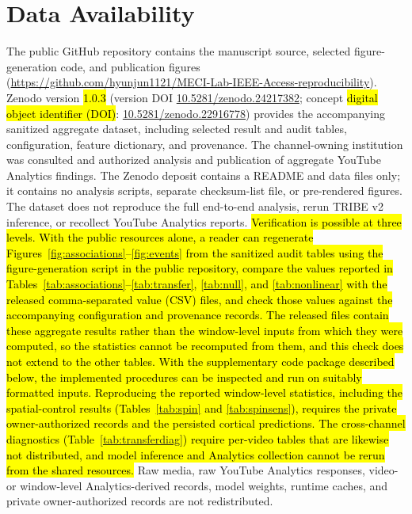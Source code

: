 \documentclass{ieeeaccess}
\newcommand{\rev}[1]{\hl{#1}}
\newcommand{\rev}[1]{#1}
\begin{document}
\section*{Data Availability}
The public GitHub repository contains the manuscript source, selected figure-generation code, and publication figures (\url{https://github.com/hyunjun1121/MECI-Lab-IEEE-Access-reproducibility}). Zenodo version \rev{1.0.3} (version DOI \mbox{\href{https://doi.org/10.5281/zenodo.24217382}{10.5281/zenodo.24217382}}; concept \rev{digital object identifier (DOI)}: \mbox{\href{https://doi.org/10.5281/zenodo.22916778}{10.5281/zenodo.22916778}}) provides the accompanying sanitized aggregate dataset, including selected result and audit tables, configuration, feature dictionary, and provenance. The channel-owning institution was consulted and authorized analysis and publication of aggregate YouTube Analytics findings. The Zenodo deposit contains a README and data files only; it contains no analysis scripts, separate checksum-list file, or pre-rendered figures. The dataset does not reproduce the full end-to-end analysis, rerun TRIBE v2 inference, or recollect YouTube Analytics reports. \rev{Verification is possible at three levels. With the public resources alone, a reader can regenerate \mbox{Figures~\ref{fig:associations}--\ref{fig:events}} from the sanitized audit tables using the figure-generation script in the public repository, compare the values reported in \mbox{Tables~\ref{tab:associations}--\ref{tab:transfer}}, \mbox{\ref{tab:null}}, and \mbox{\ref{tab:nonlinear}} with the released comma-separated value (CSV) files, and check those values against the accompanying configuration and provenance records. The released files contain these aggregate results rather than the window-level inputs from which they were computed, so the statistics cannot be recomputed from them, and this check does not extend to the other tables. With the supplementary code package described below, the implemented procedures can be inspected and run on suitably formatted inputs. Reproducing the reported window-level statistics, including the spatial-control results (\mbox{Tables~\ref{tab:spin}} and \mbox{\ref{tab:spinsens}}), requires the private owner-authorized records and the persisted cortical predictions. The cross-channel diagnostics (\mbox{Table~\ref{tab:transferdiag}}) require per-video tables that are likewise not distributed, and model inference and Analytics collection cannot be rerun from the shared resources.} Raw media, raw YouTube Analytics responses, video- or window-level Analytics-derived records, model weights, runtime caches, and private owner-authorized records are not redistributed.
\end{document}
